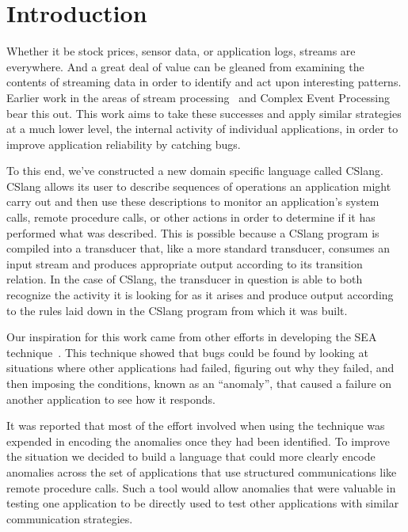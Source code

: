 \section{Introduction}
\label{SEC:introduction}

Whether it be stock prices, sensor data, or application logs,
streams are everywhere.
And a great deal of value can be gleaned
from examining the contents of streaming data
in order to identify and act upon
interesting patterns.
Earlier work in the areas of stream
processing~\cite{asdf}
and Complex Event Processing~\cite{asdf} bear this
out.
This work aims to take these successes
and apply similar strategies
at a much lower level,
the internal activity of individual applications,
in order to improve application reliability by catching bugs.

To this end,
we've constructed
a new domain specific language called CSlang.
CSlang allows its user to describe sequences of operations an application
might carry out and
then use these descriptions
to monitor an application's system calls,
remote procedure calls,
or other actions in order to determine if it has
performed what was described.
This is possible because a CSlang program is
compiled into a transducer that,
like a more standard transducer,
consumes an input stream
and produces appropriate output
according to its transition relation.
In the case of CSlang,
the transducer in question is able to
both recognize the activity it is looking for as it arises
and produce output according to the rules laid down in the CSlang
program from which it was built.

Our inspiration for this work came from other efforts in developing
the SEA technique~\cite{ASDF}.
This technique showed that bugs could be found by looking at situations
where other
applications had failed, figuring out why they failed, and then imposing
the conditions, known as an ``anomaly'',
that caused a failure on another application to see how it
responds.

It was reported that most of the effort involved when using the technique
was expended in encoding the anomalies once
they had been identified.
To improve the situation we decided to build a language
that could more clearly
encode anomalies across the set of applications that use
structured communications like remote procedure calls.
Such a tool would allow
anomalies that were
valuable in testing one application to be directly used to test other
applications with similar communication strategies.

